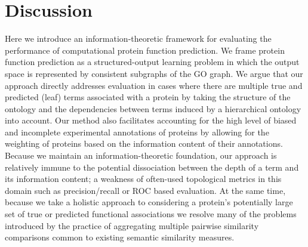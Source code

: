 


















\section{Discussion}

Here we introduce an information-theoretic framework for evaluating the performance of computational protein function prediction. We frame protein function prediction as a structured-output learning problem in which the output space is represented by consistent subgraphs of the GO graph. We argue that our approach directly addresses evaluation in cases where there are multiple true and predicted (leaf) terms associated with a protein by taking the structure of the ontology and the dependencies between terms induced by a hierarchical ontology into account. Our method also facilitates accounting for the high level of biased and incomplete experimental annotations of proteins by allowing for the weighting of proteins based on the information content of their annotations. Because we maintain an information-theoretic foundation, our approach is relatively immune to the potential dissociation between the depth of a term and its information content; a weakness of often-used topological metrics in this domain such as precision/recall or ROC based evaluation. At the same time, because we take a holistic approach to considering a protein's potentially large set of true or predicted functional associations we resolve many of the problems introduced by the practice of aggregating multiple pairwise similarity comparisons common to existing semantic similarity measures.

